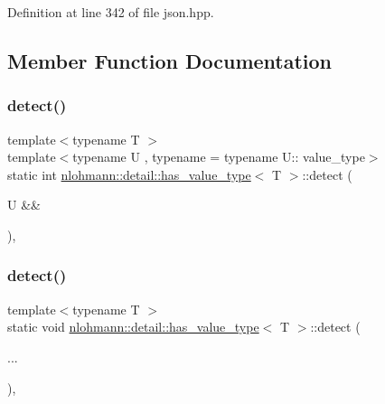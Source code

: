 Definition at line 342 of file json.\+hpp.



\subsection{Member Function Documentation}
\mbox{\label{structnlohmann_1_1detail_1_1has__value__type_a42b4183da4cb26f67fb15247dcc1f067}} 
\subsubsection{\texorpdfstring{detect()}{detect()}\hspace{0.1cm}{\footnotesize\ttfamily [1/2]}}
{\footnotesize\ttfamily template$<$typename T $>$ \\
template$<$typename U , typename  = typename U\+:: value\+\_\+type$>$ \\
static int \hyperlink{structnlohmann_1_1detail_1_1has__value__type}{nlohmann\+::detail\+::has\+\_\+value\+\_\+type}$<$ T $>$\+::detect (\begin{DoxyParamCaption}\item[{U \&\&}]{ }\end{DoxyParamCaption})\hspace{0.3cm}{\ttfamily [static]}, {\ttfamily [private]}}

\mbox{\label{structnlohmann_1_1detail_1_1has__value__type_a786ed7348908707566a7beae86f332b2}} 
\subsubsection{\texorpdfstring{detect()}{detect()}\hspace{0.1cm}{\footnotesize\ttfamily [2/2]}}
{\footnotesize\ttfamily template$<$typename T $>$ \\
static void \hyperlink{structnlohmann_1_1detail_1_1has__value__type}{nlohmann\+::detail\+::has\+\_\+value\+\_\+type}$<$ T $>$\+::detect (\begin{DoxyParamCaption}\item[{}]{... }\end{DoxyParamCaption})\hspace{0.3cm}{\ttfamily [static]}, {\ttfamily [private]}}



